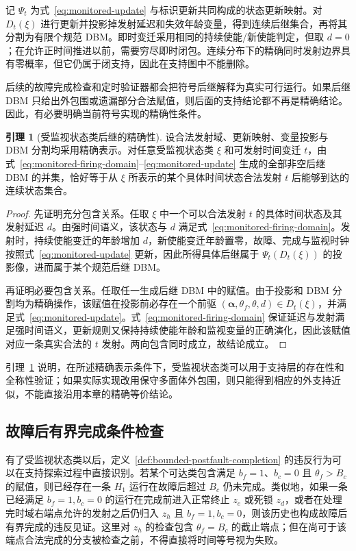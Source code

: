 \documentclass[master,fontset=ubuntu]{shnuthesis}
\theoremstyle{definition}
\newtheorem{thesislemma}{引理}
\begin{document}
记 \(\Psi_t\) 为式~\eqref{eq:monitored-update} 与标识更新共同构成的状态更新映射。对 \(D_t(\xi)\) 进行更新并投影掉发射延迟和失效年龄变量，得到连续后继集合，再将其分割为有限个规范 DBM。即时变迁采用相同的持续使能/新使能判定，但取 \(d=0\)；在允许正时间推进以前，需要穷尽即时闭包。连续分布下的精确同时发射边界具有零概率，但它仍属于闭支持，因此在支持图中不能删除。

后续的故障完成检查和定时验证器都会把符号后继解释为真实可行运行。如果后继 DBM 只给出外包围或遗漏部分合法赋值，则后面的支持结论都不再是精确结论。因此，有必要明确当前符号实现的精确性条件。

\begin{thesislemma}[受监视状态类后继的精确性]
\label{lem:monitored-successor-exact}
设合法发射域、更新映射、变量投影与 DBM 分割均采用精确表示。对任意受监视状态类 \(\xi\) 和可发射时间变迁 \(t\)，由式~\eqref{eq:monitored-firing-domain}--\eqref{eq:monitored-update} 生成的全部非空后继 DBM 的并集，恰好等于从 \(\xi\) 所表示的某个具体时间状态合法发射 \(t\) 后能够到达的连续状态集合。
\end{thesislemma}

\begin{proof}
先证明充分包含关系。任取 \(\xi\) 中一个可以合法发射 \(t\) 的具体时间状态及其发射延迟 \(d\)。由强时间语义，该状态与 \(d\) 满足式~\eqref{eq:monitored-firing-domain}。发射时，持续使能变迁的年龄增加 \(d\)，新使能变迁年龄置零，故障、完成与监视时钟按照式~\eqref{eq:monitored-update} 更新，因此所得具体后继属于 \(\Psi_t(D_t(\xi))\) 的投影像，进而属于某个规范后继 DBM。

再证明必要包含关系。任取任一生成后继 DBM 中的赋值。由于投影和 DBM 分割均为精确操作，该赋值在投影前必存在一个前驱 \((\boldsymbol\alpha,\theta_f,\theta,d)\in D_t(\xi)\)，并满足式~\eqref{eq:monitored-update}。式~\eqref{eq:monitored-firing-domain} 保证延迟与发射满足强时间语义，更新规则又保持持续使能年龄和监视变量的正确演化，因此该赋值对应一条真实合法的 \(t\) 发射。两向包含同时成立，故结论成立。
\end{proof}

引理~\ref{lem:monitored-successor-exact} 说明，在所述精确表示条件下，受监视状态类可以用于支持层的存在性和全称性验证；如果实际实现改用保守多面体外包围，则只能得到相应的外支持近似，不能直接沿用本章的精确等价结论。

\subsection{故障后有界完成条件检查}

有了受监视状态类以后，定义~\ref{def:bounded-postfault-completion} 的违反行为可以在支持探索过程中直接识别。若某个可达类包含满足 \(b_f=1\)、\(b_c=0\) 且 \(\theta_f>B_c\) 的赋值，则已经存在一条 \(H_1\) 运行在故障后超过 \(B_c\) 仍未完成。类似地，如果一条已经满足 \(b_f=1,b_c=0\) 的运行在完成前进入正常终止 \(z_e\) 或死锁 \(z_d\)，或者在处理完时域右端点允许的发射之后仍归入 \(z_h\) 且 \(b_f=1,b_c=0\)，则该历史也构成故障后有界完成的违反见证。这里对 \(z_h\) 的检查包含 \(\theta_f=B_c\) 的截止端点；但在尚可于该端点合法完成的分支被检查之前，不得直接将时间等号视为失败。
\end{document}
